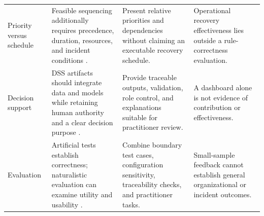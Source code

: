 \begin{table}
\begin{tabularx}{\linewidth}{>{\raggedright\arraybackslash}p{3.0cm} >{\raggedright\arraybackslash}X >{\raggedright\arraybackslash}X >{\raggedright\arraybackslash}X}
Priority versus schedule & Feasible sequencing additionally requires precedence, duration, resources, and incident conditions \cite{sahebjamnia2015integrated,elshekeil2017precesion}. & Present relative priorities and dependencies without claiming an executable recovery schedule. & Operational recovery effectiveness lies outside a rule-correctness evaluation. \\
Decision support & DSS artifacts should integrate data and models while retaining human authority and a clear decision purpose \cite{arnott2005descriptive,hevner2004design}. & Provide traceable outputs, validation, role control, and explanations suitable for practitioner review. & A dashboard alone is not evidence of contribution or effectiveness. \\
Evaluation & Artificial tests establish correctness; naturalistic evaluation can examine utility and usability \cite{venable2016feds}. & Combine boundary test cases, configuration sensitivity, traceability checks, and practitioner tasks. & Small-sample feedback cannot establish general organizational or incident outcomes. \\
\bottomrule
\end{tabularx}
\end{table}
